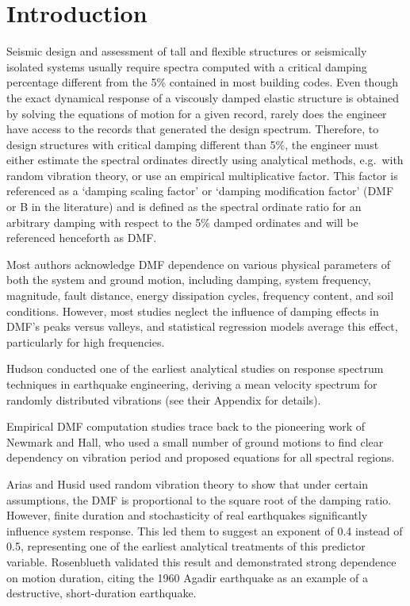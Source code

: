 \section{Introduction}\label{introduction}

Seismic design and assessment of tall and flexible structures or
seismically isolated systems usually require spectra computed with a
critical damping percentage different from the 5\% contained in most
building codes. Even though the
exact dynamical response of a viscously damped elastic structure is
obtained by solving the equations of motion for a given record, rarely
does the engineer have access to the records that generated the design
spectrum. Therefore, to design structures with critical damping
different than 5\%, the engineer must either estimate the spectral
ordinates directly using analytical methods, e.g.~with random vibration
theory, or use an empirical multiplicative factor. This factor is
referenced as a `damping scaling factor' or `damping modification
factor' (DMF or B in the literature) and is defined as the spectral
ordinate ratio for an arbitrary damping with respect to the 5\% damped
ordinates and will be referenced henceforth as DMF.

Most authors acknowledge DMF dependence on various physical parameters
of both the system and ground motion, including damping, system
frequency, magnitude, fault distance, energy dissipation cycles,
frequency content, and soil conditions. However, most studies neglect
the influence of damping effects in DMF's peaks versus valleys, and
statistical regression models average this effect, particularly for high
frequencies.

Hudson conducted one of the earliest
analytical studies on response spectrum techniques in earthquake
engineering, deriving a mean velocity spectrum for randomly distributed
vibrations (see their Appendix for details).

Empirical DMF computation studies trace back to the pioneering work of
Newmark and Hall, who used a small
number of ground motions to find clear dependency on vibration period
and proposed equations for all spectral regions.

Arias and Husid used random vibration
theory to show that under certain assumptions, the DMF is proportional
to the square root of the damping ratio. However, finite duration and
stochasticity of real earthquakes significantly influence system
response. This led them to suggest an exponent of 0.4 instead of 0.5,
representing one of the earliest analytical treatments of this predictor
variable. Rosenblueth validated
this result and demonstrated strong dependence on motion duration,
citing the 1960 Agadir earthquake as an example of a destructive,
short-duration earthquake.

